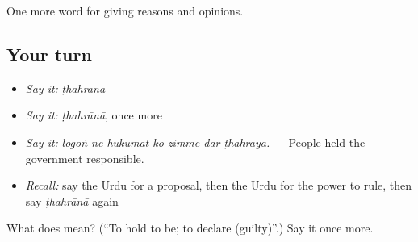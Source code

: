 \begin{grammarlens}[title={What you've built}]
One more word for giving reasons and opinions.
\end{grammarlens}

\subsection*{Your turn}
\begin{itemize}
\raggedright
  \item \emph{Say it:} \emph{ṭhahrānā}
  \item \emph{Say it:} \emph{ṭhahrānā}, once more
  \item \emph{Say it:} \emph{logoṅ ne hukūmat ko zimme-dār ṭhahrāyā.} — People held the government responsible.
  \item \emph{Recall:} say the Urdu for a proposal, then the Urdu for the power to rule, then say \emph{ṭhahrānā} again
\end{itemize}

\begin{tcolorbox}[breakable,colback=teal!4,colframe=teal!35!black,title={Before you move on}]
What does  mean? (\textquotedblleft{}To hold to be; to declare (guilty)\textquotedblright{}.) Say it once more.
\end{tcolorbox}
